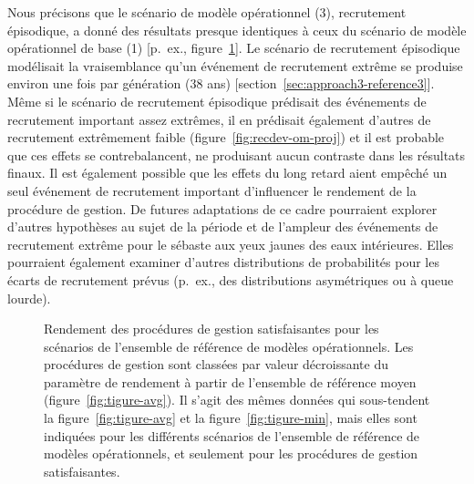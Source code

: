 \documentclass[11pt]{book}
\begin{document}
Nous précisons que le scénario de modèle opérationnel (3), recrutement épisodique, a donné des résultats presque identiques à ceux du scénario de modèle opérationnel de base (1) {[}p.~ex., figure~\ref{fig:tigure-panel}{]}. Le scénario de recrutement épisodique modélisait la vraisemblance qu'un événement de recrutement extrême se produise environ une fois par génération (38 ans) {[}section~\ref{sec:approach3-reference3}{]}. Même si le scénario de recrutement épisodique prédisait des événements de recrutement important assez extrêmes, il en prédisait également d'autres de recrutement extrêmement faible (figure~\ref{fig:recdev-om-proj}) et il est probable que ces effets se contrebalancent, ne produisant aucun contraste dans les résultats finaux. Il est également possible que les effets du long retard aient empêché un seul événement de recrutement important d'influencer le rendement de la procédure de gestion. De futures adaptations de ce cadre pourraient explorer d'autres hypothèses au sujet de la période et de l'ampleur des événements de recrutement extrême pour le sébaste aux yeux jaunes des eaux intérieures. Elles pourraient également examiner d'autres distributions de probabilités pour les écarts de recrutement prévus (p.~ex., des distributions asymétriques ou à queue lourde).


\begin{figure}[htb]

{\centering {} 

}

\caption{Rendement des procédures de gestion satisfaisantes pour les scénarios de l'ensemble de référence de modèles opérationnels. Les procédures de gestion sont classées par valeur décroissante du paramètre de rendement à partir de l'ensemble de référence moyen (figure~\ref{fig:tigure-avg}). Il s'agit des mêmes données qui sous-tendent la figure~\ref{fig:tigure-avg} et la figure~\ref{fig:tigure-min}, mais elles sont indiquées pour les différents scénarios de l'ensemble de référence de modèles opérationnels, et seulement pour les procédures de gestion satisfaisantes.}\label{fig:tigure-panel}
\end{figure}
\clearpage
\end{document}
